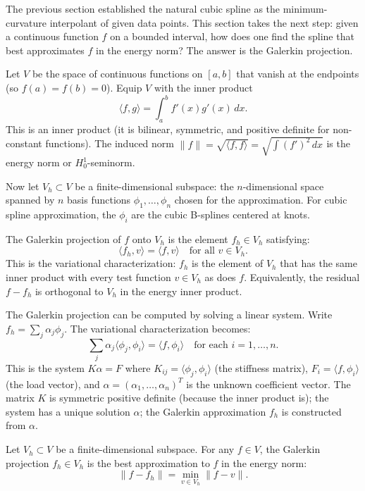 The previous section established the natural cubic spline as the
minimum-curvature interpolant of given data points. This section
takes the next step: given a continuous function $f$ on a bounded
interval, how does one find the spline that best approximates $f$ in
the energy norm? The answer is the Galerkin projection.

Let $V$ be the space of continuous functions on $[a, b]$ that vanish
at the endpoints (so $f(a) = f(b) = 0$). Equip $V$ with the inner
product
\[
\langle f, g \rangle = \int_a^b f'(x) g'(x) \, dx.
\]
This is an inner product (it is bilinear, symmetric, and positive
definite for non-constant functions). The induced norm $\|f\| =
\sqrt{\langle f, f \rangle} = \sqrt{\int (f')^2 \, dx}$ is the energy
norm or $H^1_0$-seminorm.

Now let $V_h \subset V$ be a finite-dimensional subspace: the
$n$-dimensional space spanned by $n$ basis functions $\phi_1, \ldots,
\phi_n$ chosen for the approximation. For cubic spline approximation,
the $\phi_i$ are the cubic B-splines centered at knots.

The Galerkin projection of $f$ onto $V_h$ is the element $f_h \in V_h$
satisfying:
\[
\langle f_h, v \rangle = \langle f, v \rangle \quad \text{for all } v
\in V_h.
\]
This is the variational characterization: $f_h$ is the element of
$V_h$ that has the same inner product with every test function $v
\in V_h$ as does $f$. Equivalently, the residual $f - f_h$ is
orthogonal to $V_h$ in the energy inner product.

The Galerkin projection can be computed by solving a linear system.
Write $f_h = \sum_j \alpha_j \phi_j$. The variational characterization
becomes:
\[
\sum_j \alpha_j \langle \phi_j, \phi_i \rangle = \langle f, \phi_i
\rangle \quad \text{for each } i = 1, \ldots, n.
\]
This is the system $K \alpha = F$ where $K_{ij} = \langle \phi_j,
\phi_i \rangle$ (the stiffness matrix), $F_i = \langle f, \phi_i
\rangle$ (the load vector), and $\alpha = (\alpha_1, \ldots,
\alpha_n)^T$ is the unknown coefficient vector. The matrix $K$ is
symmetric positive definite (because the inner product is); the
system has a unique solution $\alpha$; the Galerkin approximation
$f_h$ is constructed from $\alpha$.

\begin{theorem}
Let $V_h \subset V$ be a finite-dimensional subspace. For any $f \in
V$, the Galerkin projection $f_h \in V_h$ is the best approximation
to $f$ in the energy norm:
\[
\|f - f_h\| = \min_{v \in V_h} \|f - v\|.
\]
\end{theorem}

